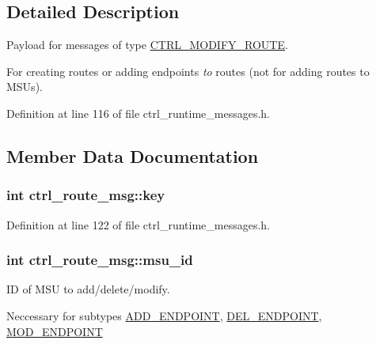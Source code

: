 \subsection{Detailed Description}
Payload for messages of type \hyperlink{ctrl__runtime__messages_8h_aff250b7918a6975b13277c84bc6ec5b9a79d3d73ddfdd3bc9813806c4ca56a6e1}{C\-T\-R\-L\-\_\-\-M\-O\-D\-I\-F\-Y\-\_\-\-R\-O\-U\-T\-E}. 

For creating routes or adding endpoints {\itshape to} routes (not for adding routes to M\-S\-Us). 

Definition at line 116 of file ctrl\-\_\-runtime\-\_\-messages.\-h.



\subsection{Member Data Documentation}
\hypertarget{structctrl__route__msg_a7451a70a3fb1930e1d8746b136d786e2}{
\subsubsection[{key}]{\setlength{\rightskip}{0pt plus 5cm}int ctrl\-\_\-route\-\_\-msg\-::key}}\label{structctrl__route__msg_a7451a70a3fb1930e1d8746b136d786e2}


Definition at line 122 of file ctrl\-\_\-runtime\-\_\-messages.\-h.

\hypertarget{structctrl__route__msg_a4b7d60f38753213c8377e9a04c6c02d4}{
\subsubsection[{msu\-\_\-id}]{\setlength{\rightskip}{0pt plus 5cm}int ctrl\-\_\-route\-\_\-msg\-::msu\-\_\-id}}\label{structctrl__route__msg_a4b7d60f38753213c8377e9a04c6c02d4}


I\-D of M\-S\-U to add/delete/modify. 

Neccessary for subtypes \hyperlink{ctrl__runtime__messages_8h_ad951c7380db78ed80db2c2484eb7daa8af26dd4724e2cbba74770d1a47cf90339}{A\-D\-D\-\_\-\-E\-N\-D\-P\-O\-I\-N\-T}, \hyperlink{ctrl__runtime__messages_8h_ad951c7380db78ed80db2c2484eb7daa8a809144b90957c455b0cd5c6563203731}{D\-E\-L\-\_\-\-E\-N\-D\-P\-O\-I\-N\-T}, \hyperlink{ctrl__runtime__messages_8h_ad951c7380db78ed80db2c2484eb7daa8aeedf1ecfee1e3618cb919b4448498723}{M\-O\-D\-\_\-\-E\-N\-D\-P\-O\-I\-N\-T} 


